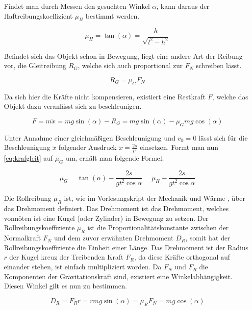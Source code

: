 \documentclass[11pt,ngerman]{scrartcl}
\begin{document}
Findet man durch Messen den gesuchten Winkel $\alpha$, kann daraus der
Haftreibungskoeffizient $\mu_H$ bestimmt werden.

\begin{equation}
    \mu_H = \tan(\alpha) = \frac{h}{\sqrt{l^2-h^2}} \label{eq:haft}
\end{equation}

Befindet sich das Objekt schon in Bewegung, liegt eine andere Art der Reibung vor,
die Gleitreibung $R_G$, welche sich auch proportional zur $F_N$ schreiben lässt.

\begin{equation}
R_G = \mu_G F_N \label{eq:gleit_ansatz}
\end{equation}

Da sich hier die Kräfte nicht kompensieren, existiert eine Restkraft $F$, welche 
das Objekt dazu veranlässt sich zu beschleunigen.

\begin{equation}
    F = m\ddot{x} = mg \sin(\alpha) - R_G = mg \sin(\alpha) - \mu_G mg \cos(\alpha) \label{eq:krafgleit}
\end{equation}

Unter Annahme einer gleichmäßigen Beschleunigung und $v_0=0$ lässt sich für die
Beschleunigung $\ddot{x}$ folgender Ausdruck $\ddot{x} = \frac{2s}{t^2}$
einsetzen. Formt man nun \autoref{eq:krafgleit} auf $\mu_G$ um, erhält man folgende Formel:

\begin{equation}
    \mu_G = \tan(\alpha)-\frac{2s}{gt^2 \cos{\alpha}} = \mu_H - \frac{2s}{gt^2 \cos{\alpha}} \label{eq:gleit}
\end{equation}

Die Rollreibung $\mu_R$ ist, wie im Vorlesungskript der Mechanik und
Wärme \cite{Knoll2020}, über das Drehmoment definiert.
Das Drehmoment ist das Drehmoment, welches vonnöten ist eine Kugel (oder Zylinder) in Bewegung
zu setzen. Der Rollreibungskoeffiziente $\mu_R$ ist
die Proportionalitätskonstante zwischen der Normalkraft $F_N$
und dem zuvor erwähnten Drehmoment $D_R$, somit
hat der Rollreibungskoeffiziente die Einheit einer
Länge. Das Drehmoment ist der Radius $r$ der Kugel kreuz der
Treibenden Kraft $F_R$, da diese Kräfte orthogonal auf einander
stehen, ist einfach multipliziert worden.
Da $F_N$ und $F_R$ die Komponenten
der Gravitationskraft sind, existiert eine Winkelabhängigkeit.
Diesen Winkel gilt es nun zu bestimmen.

\begin{equation}
    D_R = F_R r = rmg \sin(\alpha) = \mu_R F_N = mg \cos(\alpha)
\end{equation}
\end{document}
